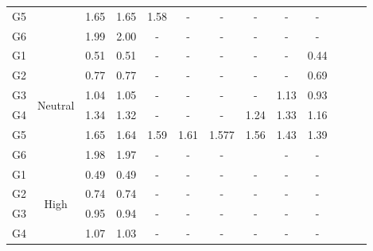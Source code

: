 \begin{landscape}
\begin{table}[t]
{\begin{tabular}{ccccccccccccc}
G5   &                          &   1.65        &   1.65        & 1.58                  &-                      &   -               &   -               &   -                   &   -   \\
G6  &                          &   1.99        &   2.00        &-                      &-                      &   -               &   -               &   -                   &   -   \\
\hline
G1    & \multirow{6}{*}{Neutral} &   0.51        &   0.51        &-                      &-                      &   -               & -                 &-                      & 0.44  \\
G2   &                          &   0.77        &   0.77        &-                      &-                      &   -               & -                 &-                      & 0.69  \\
G3  &                          &   1.04        &   1.05        &-                      &-                      &   -               & -                 & 1.13                  & 0.93  \\
G4     &                          &   1.34        &   1.32        &-                      &-                      &   -               & 1.24              & 1.33                  & 1.16  \\
G5    &                          &   1.65        &   1.64        & 1.59                  & 1.61                  &   1.577           & 1.56              & 1.43                  & 1.39  \\
G6   &                          &   1.98        &   1.97        &-                      &-                      &   -               &                   &-                      &   -   \\
\hline
G1     & \multirow{6}{*}{High}    &   0.49        &   0.49        &-                      &-                      &   -               &   -               &   -                   &   -   \\
G2    &                          &   0.74        &   0.74        &-                      &-                      &   -               &   -               &   -                   &   -   \\
G3   &                          &   0.95        &   0.94        &-                      &-                      &   -               &   -               &   -                   &   -   \\
G4  &                          &   1.07        &   1.03        &-                      &-                      &   -               &   -               &   -                   &   -   \\

\end{tabular}}
\end{table}
\end{landscape}

